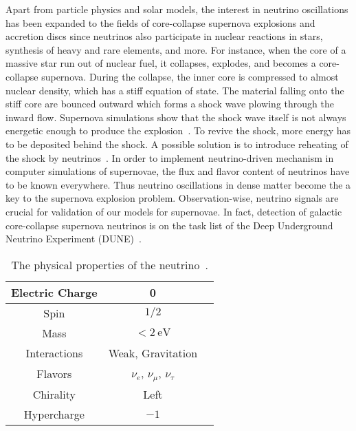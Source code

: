 Apart from particle physics and solar models, the interest in neutrino oscillations has been expanded to the fields of core-collapse supernova explosions and accretion discs since neutrinos also participate in nuclear reactions in stars, synthesis of heavy and rare elements, and more. For instance, when the core of a massive star run out of nuclear fuel, it collapses, explodes, and becomes a core-collapse supernova. During the collapse, the inner core is compressed to almost nuclear density, which has a stiff equation of state. The material falling onto the stiff core are bounced outward which forms a shock wave plowing through the inward flow. Supernova simulations show that the shock wave itself is not always energetic enough to produce the explosion~\cite{Janka2016b}. To revive the shock, more energy has to be deposited behind the shock. A possible solution is to introduce reheating of the shock by neutrinos~\cite{Janka2016b}. In order to implement neutrino-driven mechanism in computer simulations of supernovae, the flux and flavor content of neutrinos have to be known everywhere. Thus neutrino oscillations in dense matter become the a key to the supernova explosion problem. Observation-wise, neutrino signals are crucial for validation of our models for supernovae. In fact, detection of galactic core-collapse supernova neutrinos is on the task list of the Deep Underground Neutrino Experiment (DUNE)~\cite{Kemp2017}.

\begin{table}[ht]
\centering
 \begin{tabular}{|c | c | c|}
 \hline
  Electric Charge & 0\\
  \hline
  Spin & $1/2$ \\
\hline
 Mass & $<2~\mathrm{eV}$ \\
 \hline
 Interactions & Weak, Gravitation  \\
 \hline
 Flavors & $\nu_e$, $\nu_\mu$, $\nu_\tau$ \\
 \hline
 Chirality & Left \\
 \hline
 Hypercharge & $-1$ \\
 \hline

 \end{tabular}
 \caption{The physical properties of the neutrino~\cite{Patrignani:2016xqp}.}
\label{table:neutrino-properties}
\end{table}


